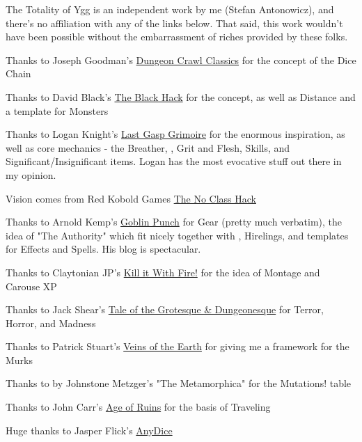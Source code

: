 

The Totality of Ygg is an independent work by me (Stefan Antonowicz), and there's no affiliation with any of the links below.  That said, this work wouldn't have been possible without the embarrassment of riches provided by these folks.


Thanks to Joseph Goodman's \href{http://www.goodman-games.com/}{Dungeon Crawl Classics} for the concept of the Dice Chain

Thanks to David Black's \href{https://the-black-hack.jehaisleprintemps.net/}{The Black Hack} for the \UD concept, as well as Distance and a template for Monsters

Thanks to Logan Knight's \href{https://www.lastgaspgrimoire.com}{Last Gasp Grimoire} for the enormous inspiration, as well as core mechanics - the Breather, \MD, Grit and Flesh, Skills, and Significant/Insignificant items.  Logan has the most evocative stuff out there in my opinion.

Vision comes from Red Kobold Games \href{http://www.redkobold.com/}{The No Class Hack}

Thanks to Arnold Kemp's \href{https://goblinpunch.blogspot.com/}{Goblin Punch} for Gear (pretty much verbatim), the idea of "The Authority" which fit nicely together with \TheAuthority, Hirelings, and templates for Effects and Spells.  His blog is spectacular.

Thanks to Claytonian JP's \href{http://killitwithfirerpg.blogspot.com/2014/06/xp-for-gold-revision-100-montage.html}{Kill it With Fire!} for the idea of Montage and Carouse XP

Thanks to Jack Shear's \href{http://talesofthegrotesqueanddungeonesque.blogspot.com}{Tale of the Grotesque \& Dungeonesque} for Terror, Horror, and Madness

Thanks to Patrick Stuart's \href{http://www.lotfp.com/store/index.php?route=product/product\&product_id=262}{Veins of the Earth} for giving me a framework for the Murks

Thanks to by Johnstone Metzger's "The Metamorphica" for the Mutations! table

Thanks to John Carr's \href{https://ageofruins.wordpress.com/2012/10/18/deck-of-many-threats-wilderness-encounters-based-on-playing-cards-plus-a-simple-system-for-provisions/}{Age of Ruins} for the basis of Traveling 

Huge thanks to Jasper Flick's \href{https://anydice.com}{AnyDice}


